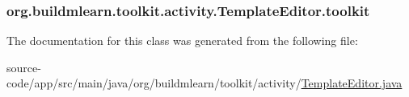\subsubsection[{\texorpdfstring{toolkit}{toolkit}}]{ org.\+buildmlearn.\+toolkit.\+activity.\+Template\+Editor.\+toolkit\hspace{0.3cm}{\ttfamily [private]}}\hypertarget{classorg_1_1buildmlearn_1_1toolkit_1_1activity_1_1TemplateEditor_af6325370557d88b7e0e8852634509a46}{}\label{classorg_1_1buildmlearn_1_1toolkit_1_1activity_1_1TemplateEditor_af6325370557d88b7e0e8852634509a46}


The documentation for this class was generated from the following file\+:\begin{DoxyCompactItemize}
\item 
source-\/code/app/src/main/java/org/buildmlearn/toolkit/activity/\hyperlink{TemplateEditor_8java}{Template\+Editor.\+java}\end{DoxyCompactItemize}
